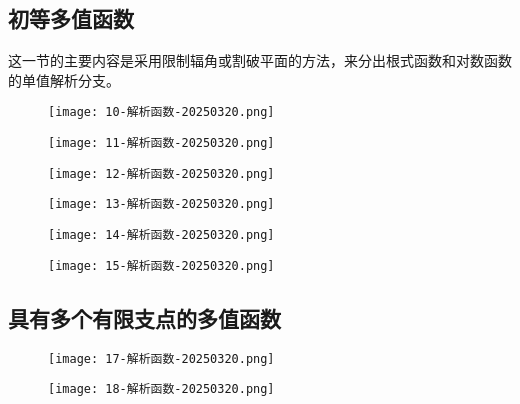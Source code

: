 \subsection{初等多值函数}

这一节的主要内容是采用限制辐角或割破平面的方法，来分出根式函数和对数函数的单值解析分支。

\begin{figure}[H]
\centering
\texttt{[image: 10-解析函数-20250320.png]}
\label{}
\end{figure}

\begin{exercise}
\begin{figure}[H]
\centering
\texttt{[image: 11-解析函数-20250320.png]}
\label{}
\end{figure}
\end{exercise}
\begin{figure}[H]
\centering
\texttt{[image: 12-解析函数-20250320.png]}
\label{}
\end{figure}

\begin{figure}[H]
\centering
\texttt{[image: 13-解析函数-20250320.png]}
\label{}
\end{figure}

\begin{figure}[H]
\centering
\texttt{[image: 14-解析函数-20250320.png]}
\label{}
\end{figure}

\begin{figure}[H]
\centering
\texttt{[image: 15-解析函数-20250320.png]}
\label{}
\end{figure}

\subsection{具有多个有限支点的多值函数}

\begin{figure}[H]
\centering
\texttt{[image: 17-解析函数-20250320.png]}
\label{}
\end{figure}

\begin{figure}[H]
\centering
\texttt{[image: 18-解析函数-20250320.png]}
\label{}
\end{figure}

